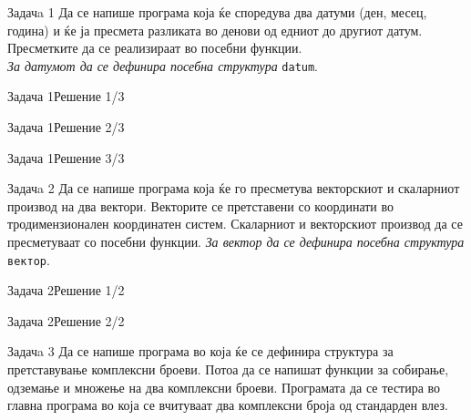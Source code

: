 
\begin{frame}{Задачa 1}
Да се напише програма која ќе споредува два датуми (ден, месец, година) и ќе ја
пресмета разликата во денови од едниот до другиот датум. Пресметките да се
реализираат во посебни функции.\\
\emph{За датумот да се дефинира посебна структура} \texttt{datum}.
\end{frame}

\begin{frame}[fragile]{Задача 1}{Решение 1/3}

\end{frame}

\begin{frame}[fragile]{Задача 1}{Решение 2/3}

\end{frame}

\begin{frame}[fragile]{Задача 1}{Решение 3/3}

\end{frame}

\begin{frame}{Задачa 2}
Да се напише програма која ќе го пресметува векторскиот и скаларниот производ на
два вектори. Векторите се претставени со координати во тродимензионален
координатен систем. Скаларниот и векторскиот производ да се пресметуваат со
посебни функции.
\emph{За вектор да се дефинира посебна структура} \texttt{вектор}.
\end{frame}

\begin{frame}[fragile]{Задача 2}{Решение 1/2}

\end{frame}

\begin{frame}[fragile]{Задача 2}{Решение 2/2}

\end{frame}

\begin{frame}{Задачa 3}
Да се напише програма во која ќе се дефинира структура за претставување
комплексни броеви. Потоа да се напишат функции за собирање, одземање и множење
на два комплексни броеви. Програмата да се тестира во главна програма во која се
вчитуваат два комплексни броја од стандарден влез.
\end{frame}

